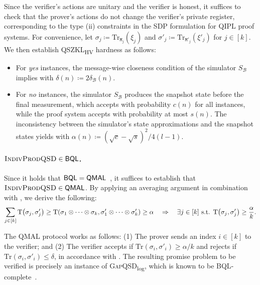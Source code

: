 \documentclass[11pt, a4paper]{article}
\numberwithin{equation}{section}
\numberwithin{figure}{section}
\newcommand{\QIPL}{\textnormal{\textsf{QIPL}}\xspace}
\newcommand{\QMAL}{\textnormal{\textsf{QMAL}}\xspace}
\newcommand{\QSZKLHV}{\texorpdfstring{\textnormal{\textsf{QSZKL}\textsubscript{\textnormal{HV}}}}\xspace}
\newcommand{\BQL}{\textnormal{\textsf{BQL}}\xspace}
\newcommand{\GapQSDlog}{\texorpdfstring{\textnormal{\textsc{GapQSD}\textsubscript{log}}}\xspace}
\newcommand{\IndivProdQSD}{\textnormal{\textsc{IndivProdQSD}}\xspace}
\DeclarePairedDelimiter\rbra{\lparen}{\rparen}
\newcommand{\Tr}{\mathrm{Tr}}
\newcommand{\td}{\mathrm{T}}
\newcommand{\calB}{\mathcal{B}}
\newcommand{\ttM}{\mathtt{M}}
\begin{document}
Since the verifier's actions are unitary and the verifier is honest, it suffices to check that the prover's actions do not change the verifier's private register, corresponding to the type (ii) constraints  in the SDP formulation for \QIPL{} proof systems. For convenience, let $\sigma_j \coloneq \Tr_{\ttM_j}(\xi_j)$ and $\sigma'_j \coloneq \Tr_{\ttM'_j}(\xi'_j)$ for $j\in[k]$. 
We then establish \QSZKLHV{} hardness as follows: 
\begin{itemize}[itemsep=0.33em, topsep=0.33em, parsep=0.33em]
    \item For \textit{yes} instances, the message-wise closeness condition of the simulator $S_{\calB}$ implies  with $\delta(n) \coloneqq 2\delta_{\calB}(n)$. 
    \item For \textit{no} instances, the simulator $S_{\calB}$ produces the snapshot state before the final measurement, which accepts with probability $c(n)$ for all instances, while the proof system accepts with probability at most $s(n)$. The inconsistency between the simulator's state approximations and the snapshot states yields  with $\alpha(n) \coloneqq (\sqrt{c}-\sqrt{s})^2/4(l-1)$.  
\end{itemize}

\paragraph{$\IndivProdQSD{} \in \BQL$.} Since it holds that  $\BQL=\QMAL$~\cite{FKLMN16,FR21}, it suffices to establish that $\IndivProdQSD{} \in \QMAL$. By applying an averaging argument in combination with , we derive the following: 
\begin{equation}
    \label{eq:intro-indiv-far}
    \sum_{j\in[k]} \td\rbra*{\sigma_j,\sigma'_j} \geq \td\rbra*{\sigma_1 \otimes \cdots \otimes \sigma_k, \sigma'_1 \otimes \cdots \otimes \sigma'_k} \geq \alpha 
    \quad \Rightarrow \quad 
    \exists j\in[k] \text{ s.t. } \td\rbra*{\sigma_j,\sigma'_j} \geq \frac{\alpha}{k}. 
\end{equation}

The \QMAL{} protocol works as follows: (1) The prover sends an index $i\in[k]$ to the verifier; and (2) The verifier accepts if $\Tr(\sigma_i,\sigma'_i) \geq \alpha/k$ and rejects if $\Tr(\sigma_i,\sigma'_i) \leq \delta$, in accordance with . The resulting promise problem to be verified is precisely an instance of \GapQSDlog{}, which is known to be \BQL{}-complete~\cite{LGLW23}. 
\end{document}
